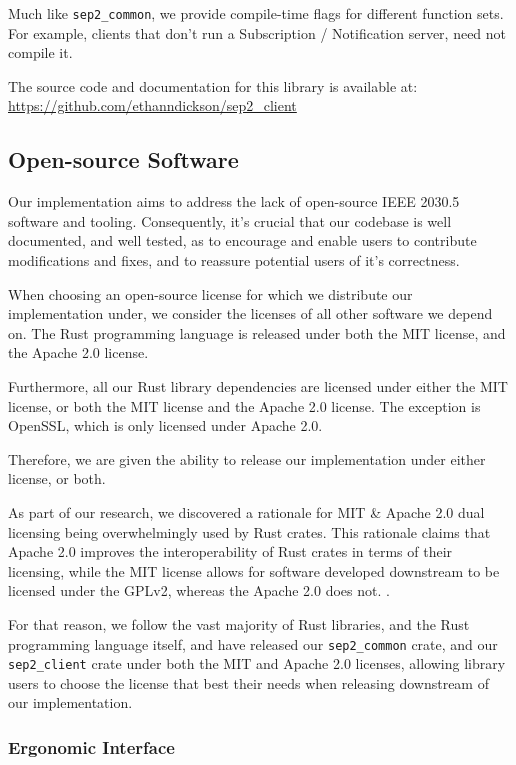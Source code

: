 Much like \texttt{sep2\_common}, we provide compile-time flags for different function sets. For example, clients that don't run a Subscription / Notification server, need not compile it.

The source code and documentation for this library is available at: \url{https://github.com/ethanndickson/sep2_client}

\subsection{Open-source Software}
Our implementation aims to address the lack of open-source IEEE 2030.5 software and tooling. Consequently, it's crucial that our codebase is well documented, and well tested, as to encourage and enable users to contribute modifications and fixes, and to reassure potential users of it's correctness.

When choosing an open-source license for which we distribute our implementation under, we consider the licenses of all other software we depend on. The Rust programming language is released under both the MIT license, and the Apache 2.0 license. 

Furthermore, all our Rust library dependencies are licensed under either the MIT license, or both the MIT license and the Apache 2.0 license. The exception is OpenSSL, which is only licensed under Apache 2.0.

Therefore, we are given the ability to release our implementation under either license, or both. 

As part of our research, we discovered a rationale for MIT \& Apache 2.0 dual licensing being overwhelmingly used by Rust crates. This rationale claims that Apache 2.0 improves the interoperability of Rust crates in terms of their licensing, while the MIT license allows for software developed downstream to be licensed under the GPLv2, whereas the Apache 2.0 does not. \cite{relicense} \cite{relicensejosh}. 


For that reason, we follow the vast majority of Rust libraries, and the Rust programming language itself, and have released our \texttt{sep2\_common} crate, and our \texttt{sep2\_client} crate under both the MIT and Apache 2.0 licenses, allowing library users to choose the license that best their needs when releasing downstream of our implementation.

\subsubsection{Ergonomic Interface}

